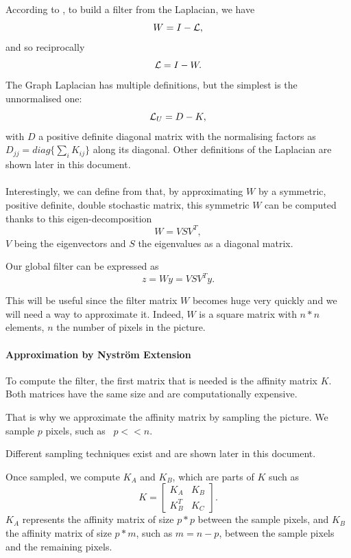 \paragraph{}
According to \cite{modern_tour_2013}, to build a filter from the Laplacian, we have
\[W = I - \operatorname{\mathcal{L}},\]
and so reciprocally
\[\operatorname{\mathcal{L}} = I - W.\]
The Graph Laplacian has multiple definitions, but the simplest is the unnormalised one:
\[\operatorname{\mathcal{L}}_U = D - K,\]
with \(D\) a positive definite diagonal matrix with the normalising factors as \(D_{jj} = diag\{\sum_i K_{ij}\}\) along its diagonal.
Other definitions of the Laplacian are shown later in this document. %

\paragraph{}
Interestingly, we can define from \cite{glide_2014} that, by approximating \(W\) by a symmetric, positive definite, double stochastic matrix, this symmetric \(W\) can be computed thanks to this eigen-decomposition
\[W = VSV^T,\]
\(V\) being the eigenvectors and \(S\) the eigenvalues as a diagonal matrix.

Our global filter can be expressed as
\[z = Wy = VSV^Ty.\]

This will be useful since the filter matrix \(W\) becomes huge very quickly and we will need a way to approximate it. Indeed, \(W\) is a square matrix with \(n*n\) elements, \(n\) the number of pixels in the picture.

\paragraph{Approximation by Nystr\"om Extension}

To compute the filter, the first matrix that is needed is the affinity matrix \(K\).
Both matrices have the same size and are computationally expensive.

That is why we approximate the affinity matrix by sampling the picture.
We sample \(p\) pixels, such as  \(p << n\).

Different sampling techniques exist and are shown later in this document. %

Once sampled, we compute \(K_A\) and \(K_B\), which are parts of \(K\) such as
\[
 K = \begin{bmatrix}
  K_A & K_B \\
  K_B^T & K_C
 \end{bmatrix}.
\]
\(K_A\) represents the affinity matrix of size \(p*p\) between the sample pixels, and \(K_B\) the affinity matrix of size \(p*m\), such as \(m = n-p\), between the sample pixels and the remaining pixels.

